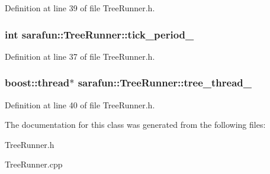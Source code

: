 Definition at line 39 of file Tree\-Runner.\-h.

\hypertarget{classsarafun_1_1TreeRunner_a90077a79ad9abeddaf0083827b87e423_a90077a79ad9abeddaf0083827b87e423}{
\subsubsection[{tick\-\_\-period\-\_\-}]{\setlength{\rightskip}{0pt plus 5cm}int sarafun\-::\-Tree\-Runner\-::tick\-\_\-period\-\_\-\hspace{0.3cm}{\ttfamily [private]}}}\label{classsarafun_1_1TreeRunner_a90077a79ad9abeddaf0083827b87e423_a90077a79ad9abeddaf0083827b87e423}


Definition at line 37 of file Tree\-Runner.\-h.

\hypertarget{classsarafun_1_1TreeRunner_a8279cc833571c5e46c59d1b801c8d38b_a8279cc833571c5e46c59d1b801c8d38b}{
\subsubsection[{tree\-\_\-thread\-\_\-}]{\setlength{\rightskip}{0pt plus 5cm}boost\-::thread$\ast$ sarafun\-::\-Tree\-Runner\-::tree\-\_\-thread\-\_\-\hspace{0.3cm}{\ttfamily [private]}}}\label{classsarafun_1_1TreeRunner_a8279cc833571c5e46c59d1b801c8d38b_a8279cc833571c5e46c59d1b801c8d38b}


Definition at line 40 of file Tree\-Runner.\-h.



The documentation for this class was generated from the following files\-:\begin{DoxyCompactItemize}
\item 
Tree\-Runner.\-h\item 
Tree\-Runner.\-cpp\end{DoxyCompactItemize}
